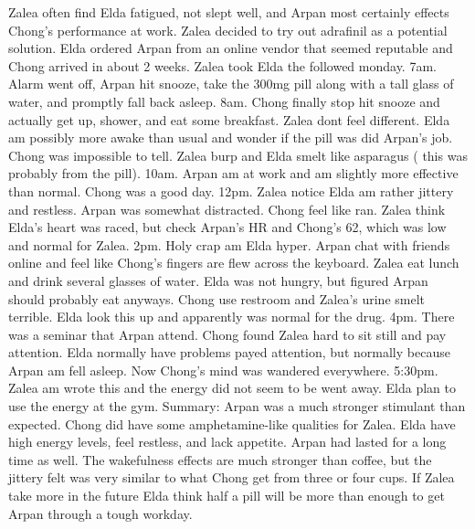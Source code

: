 \documentclass[12pt]{book}
\begin{document}
Zalea often find Elda fatigued, not slept well, and Arpan most certainly effects Chong's performance at work. Zalea decided to try out adrafinil as a potential solution. Elda ordered Arpan from an online vendor that seemed reputable and Chong arrived in about 2 weeks. Zalea took Elda the followed monday. 7am. Alarm went off, Arpan hit snooze, take the 300mg pill along with a tall glass of water, and promptly fall back asleep. 8am. Chong finally stop hit snooze and actually get up, shower, and eat some breakfast. Zalea dont feel different. Elda am possibly more awake than usual and wonder if the pill was did Arpan's job. Chong was impossible to tell. Zalea burp and Elda smelt like asparagus ( this was probably from the pill). 10am. Arpan am at work and am slightly more effective than normal. Chong was a good day. 12pm. Zalea notice Elda am rather jittery and restless. Arpan was somewhat distracted. Chong feel like ran. Zalea think Elda's heart was raced, but check Arpan's HR and Chong's 62, which was low and normal for Zalea. 2pm. Holy crap am Elda hyper. Arpan chat with friends online and feel like Chong's fingers are flew across the keyboard. Zalea eat lunch and drink several glasses of water. Elda was not hungry, but figured Arpan should probably eat anyways. Chong use restroom and Zalea's urine smelt terrible. Elda look this up and apparently was normal for the drug. 4pm. There was a seminar that Arpan attend. Chong found Zalea hard to sit still and pay attention. Elda normally have problems payed attention, but normally because Arpan am fell asleep. Now Chong's mind was wandered everywhere. 5:30pm. Zalea am wrote this and the energy did not seem to be went away. Elda plan to use the energy at the gym. Summary: Arpan was a much stronger stimulant than expected. Chong did have some amphetamine-like qualities for Zalea. Elda have high energy levels, feel restless, and lack appetite. Arpan had lasted for a long time as well. The wakefulness effects are much stronger than coffee, but the jittery felt was very similar to what Chong get from three or four cups. If Zalea take more in the future Elda think half a pill will be more than enough to get Arpan through a tough workday.
\end{document}
